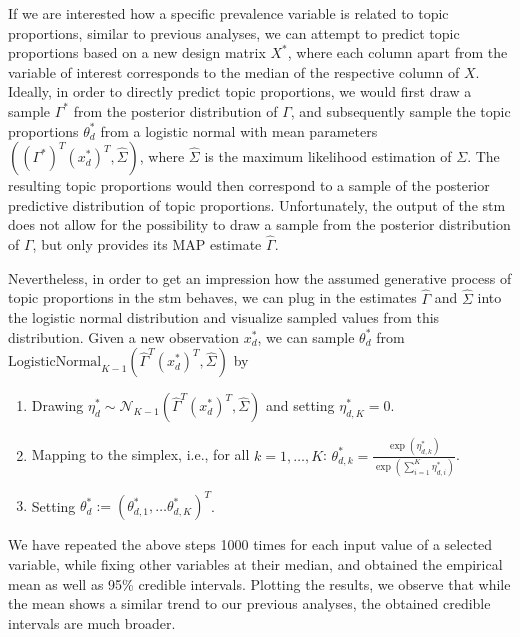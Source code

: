 If we are interested how a specific prevalence variable is related to topic proportions, similar to previous analyses, we can attempt to predict topic proportions based on a new design matrix $X^*$, where each column apart from the variable of interest corresponds to the median of the respective column of $X$. Ideally, in order to directly predict topic proportions, we would first draw a sample $\Gamma^*$ from the posterior distribution of $\Gamma$, and subsequently sample the topic proportions $\theta_d^*$ from a logistic normal with mean parameters $((\Gamma^*)^T (x_d^*)^T, \hat{\Sigma})$, where $\hat{\Sigma}$ is the maximum likelihood estimation of $\Sigma$. The resulting topic proportions would then correspond to a sample of the posterior predictive distribution of topic proportions. Unfortunately, the output of the stm does not allow for the possibility to draw a sample from the posterior distribution of $\Gamma$, but only provides its MAP estimate $\hat{\Gamma}$. 

Nevertheless, in order to get an impression how the assumed generative process of topic proportions in the stm behaves, we can plug in the estimates $\hat{\Gamma}$ and $\hat{\Sigma}$ into the logistic normal distribution and visualize sampled values from this distribution. Given a new observation $x_d^*$, we can sample $\theta_d^*$ from $\text{LogisticNormal}_{K-1}(\hat{\Gamma}^T(x_d^*)^T, \hat{\Sigma})$ by

\begin{enumerate}
\item Drawing $\eta_d^* \sim \mathcal{N}_{K-1}(\hat{\Gamma}^T(x_d^*)^T, \hat{\Sigma})$ and setting $\eta^*_{d,K} = 0$.
\item Mapping to the simplex, i.e., for all $k = 1,\dots,K$: $\theta_{d,k}^* = \frac{\exp(\eta^*_{d,k})}{\exp(\sum_{i=1}^{K} \eta^*_{d,i})}$.
\item Setting $\theta_d^* := (\theta_{d,1}^*, \dots \theta_{d,K}^*)^T$.
\end{enumerate}

We have repeated the above steps 1000 times for each input value of a selected variable, while fixing other variables at their median, and obtained the empirical mean as well as 95\% credible intervals. Plotting the results, we observe that while the mean shows a similar trend to our previous analyses, the obtained credible intervals are much broader.

